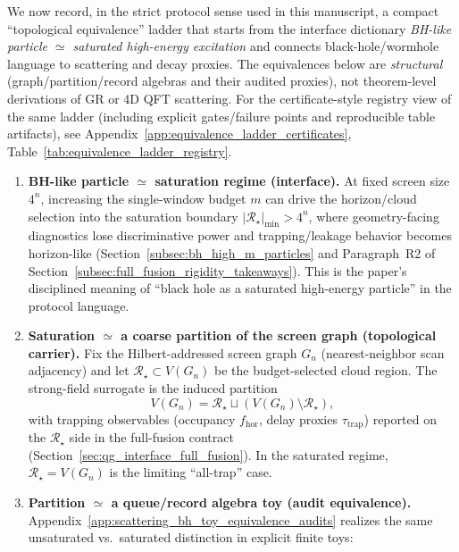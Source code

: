 \begin{remark}
\label{rem:bh_wh_scattering_topological_equivalence_ladder}
\AuditTag We now record, in the strict protocol sense used in this manuscript, a compact ``topological equivalence'' ladder that
starts from the interface dictionary \emph{BH-like particle $\simeq$ saturated high-energy excitation} and connects black-hole/wormhole language to scattering and decay proxies.
The equivalences below are \emph{structural} (graph/partition/record algebras and their audited proxies), not theorem-level derivations of GR or 4D QFT scattering.
For the certificate-style registry view of the same ladder (including explicit gates/failure points and reproducible table artifacts), see
Appendix~\ref{app:equivalence_ladder_certificates}, Table~\ref{tab:equivalence_ladder_registry}.
\begin{enumerate}
\item \textbf{BH-like particle $\simeq$ saturation regime (interface).}
At fixed screen size $4^n$, increasing the single-window budget $m$ can drive the horizon/cloud selection into the saturation boundary
$|{\mathcal R}_\star|_{\min}>4^n$, where geometry-facing diagnostics lose discriminative power and trapping/leakage behavior becomes horizon-like
(Section~\ref{subsec:bh_high_m_particles} and Paragraph~R2 of Section~\ref{subsec:full_fusion_rigidity_takeaways}).
This is the paper's disciplined meaning of ``black hole as a saturated high-energy particle'' in the protocol language.
\item \textbf{Saturation $\simeq$ a coarse partition of the screen graph (topological carrier).}
Fix the Hilbert-addressed screen graph $G_n$ (nearest-neighbor scan adjacency) and let ${\mathcal R}_\star\subset V(G_n)$ be the budget-selected cloud region.
The strong-field surrogate is the induced partition
\[
V(G_n)= {\mathcal R}_\star \sqcup (V(G_n)\setminus {\mathcal R}_\star),
\]
with trapping observables (occupancy $f_{\mathrm{hor}}$, delay proxies $\tau_{\mathrm{trap}}$) reported on the ${\mathcal R}_\star$ side in the full-fusion contract
(Section~\ref{sec:qg_interface_full_fusion}).
In the saturated regime, ${\mathcal R}_\star=V(G_n)$ is the limiting ``all-trap'' case.
\item \textbf{Partition $\simeq$ a queue/record algebra toy (audit equivalence).}
Appendix~\ref{app:scattering_bh_toy_equivalence_audits} realizes the same unsaturated vs.\ saturated distinction in explicit finite toys:

\end{enumerate}
\end{remark}
